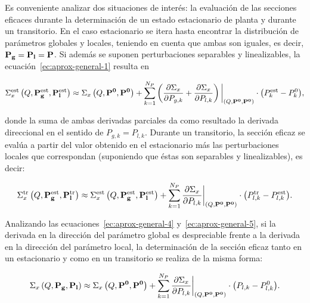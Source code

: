 \documentclass[11pt]{article}
\renewcommand{\vec}[1]{\ensuremath\mathbf{#1}}
\begin{document}
Es conveniente analizar dos situaciones de interés: la evaluación de las secciones eficaces durante la determinación de un estado estacionario de planta y durante un transitorio. En el caso estacionario se itera hasta encontrar la distribución de parámetros globales y locales, teniendo en cuenta que ambas son iguales, es decir, $\vec{P_g} = \vec{P_l} = \vec{P}$. Si además se suponen perturbaciones separables y linealizables, la ecuación~\ref{ec:aprox-general-1} resulta en

\begin{equation} \label{ec:aprox-general-4}
 \Sigma^{\text{est}}_x \left( Q, \vec{P^{\text{est}}_g}, \vec{P^{\text{est}}_l} \right) \approx
 \Sigma_x \left( Q, \vec{P^0}, \vec{P^0} \right) + 
 \sum_{k = 1}^{N_P}{\left( \frac{\partial\Sigma_x}{\partial P_{g,k}} + \frac{\partial\Sigma_x}{\partial P_{l,k}} \right)\bigg|_{\left( Q, \vec{P^0}, \vec{P^0} \right)} \cdot \left(P^{\text{est}}_k - P^0_k \right) },
\end{equation}

\noindent
donde la suma de ambas derivadas parciales da como resultado la derivada direccional en el sentido de $P_{g,k} = P_{l,k}$. Durante un transitorio, la sección eficaz se evalúa a partir del valor obtenido en el estacionario más las perturbaciones locales que correspondan (suponiendo que éstas son separables y linealizables), es decir:

\begin{equation} \label{ec:aprox-general-5}
 \Sigma^{\text{tr}}_x \left( Q, \vec{P^{\text{est}}_g}, \vec{P^{\text{tr}}_l} \right) \approx 
 \Sigma^{\text{est}}_x \left( Q, \vec{P^{\text{est}}_g}, \vec{P^{\text{est}}_l} \right) + 
 \sum_{k = 1}^{N_P}{\frac{\partial\Sigma_x}{\partial P_{l,k}}\bigg|_{\left( Q, \vec{P^0}, \vec{P^0} \right)} \cdot \left(P^{\text{tr}}_{l,k} - P^{\text{est}}_{l,k} \right) }.
\end{equation}

\noindent
Analizando las ecuaciones~\ref{ec:aprox-general-4} y~\ref{ec:aprox-general-5}, si la derivada en la dirección del parámetro global es despreciable frente a la derivada en la dirección del parámetro local, la determinación de la sección eficaz tanto en un estacionario y como en un transitorio se realiza de la misma forma:

\begin{equation} \label{ec:aprox-general-6}
 \Sigma_x \left( Q, \vec{P_g}, \vec{P_l} \right) \approx 
 \Sigma_x \left( Q, \vec{P^0}, \vec{P^0} \right) + 
 \sum_{k = 1}^{N_P}{\frac{\partial\Sigma_x}{\partial P_{l,k}}\bigg|_{\left( Q, \vec{P^0}, \vec{P^0} \right)} \cdot \left(P_{l,k} - P^0_{l,k} \right) }.
\end{equation}
\end{document}
